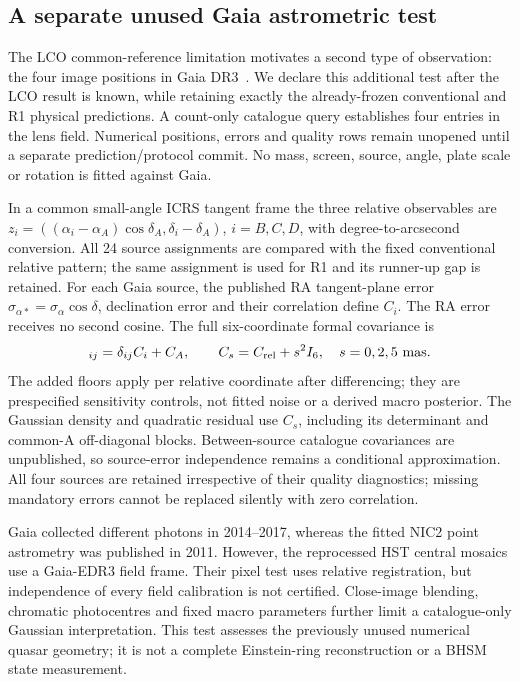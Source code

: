\subsection{A separate unused Gaia astrometric test}
\label{sec:he0435-gaia}
The LCO common-reference limitation motivates a second type of observation:
the four image positions in Gaia DR3~\cite{GaiaDR3}. We declare this
additional test after the LCO result is known, while retaining exactly the
already-frozen conventional and R1 physical predictions. A count-only
catalogue query establishes four entries in the lens field. Numerical
positions, errors and quality rows remain unopened until a separate
prediction/protocol commit. No mass, screen, source, angle, plate scale or
rotation is fitted against Gaia.

In a common small-angle ICRS tangent frame the three relative observables
are $z_i=((\alpha_i-\alpha_A)\cos\delta_A,\delta_i-\delta_A)$,
$i=B,C,D$, with degree-to-arcsecond conversion. All 24 source assignments
are compared with the fixed conventional relative pattern; the same
assignment is used for R1 and its runner-up gap is retained. For each Gaia
source, the published RA tangent-plane error
$\sigma_{\alpha*}=\sigma_\alpha\cos\delta$, declination error and their
correlation define $C_i$. The RA error receives no second cosine.
The full six-coordinate formal covariance is
\begin{equation}
 [C_{\rm rel}]_{ij}=\delta_{ij}C_i+C_A,
 \qquad C_s=C_{\rm rel}+s^2I_6,
 \quad s=0,2,5\ {\rm mas}.
 \label{eq:gaia-covariance}
\end{equation}
The added floors apply per relative coordinate after differencing; they
are prespecified sensitivity controls, not fitted noise or a derived macro
posterior. The Gaussian density and quadratic residual use $C_s$, including
its determinant and common-A off-diagonal blocks. Between-source catalogue
covariances are unpublished, so source-error independence remains a
conditional approximation. All four sources are retained irrespective of
their quality diagnostics; missing mandatory errors cannot be replaced
silently with zero correlation.

Gaia collected different photons in 2014--2017, whereas the fitted NIC2
point astrometry was published in 2011. However, the reprocessed HST central
mosaics use a Gaia-EDR3 field frame. Their pixel test uses relative
registration, but independence of every field calibration is not certified.
Close-image blending, chromatic photocentres and fixed macro parameters
further limit a catalogue-only Gaussian interpretation. This test assesses
the previously unused numerical quasar geometry; it is not a complete
Einstein-ring reconstruction or a BHSM state measurement.


